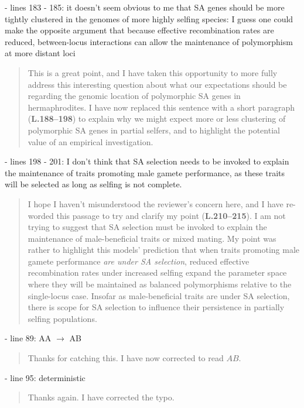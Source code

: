 \documentclass[11pt]{article}
\begin{document}
 - lines 183 - 185: it doesn't seem obvious to me that SA genes should be more tightly clustered in the genomes of more highly selfing species: I guess one could make the opposite argument that because effective recombination rates are reduced, between-locus interactions can allow the maintenance of polymorphism at more distant loci

	\begin{quote}
		This is a great point, and I have taken this opportunity to more fully address this interesting question about what our expectations should be regarding the genomic location of polymorphic SA genes in hermaphrodites. I have now replaced this sentence with a short paragraph (\textbf{L.188--198}) to explain why we might expect more or less clustering of polymorphic SA genes in partial selfers, and to highlight the potential value of an empirical investigation. 
	\end{quote}

 - lines 198 - 201: I don't think that SA selection needs to be invoked to explain the maintenance of traits promoting male gamete performance, as these traits will be selected as long as selfing is not complete.

	\begin{quote}
		I hope I haven't misunderstood the reviewer's concern here, and I have re-worded this passage to try and clarify my point (\textbf{L.210--215}). I am not trying to suggest that SA selection must be invoked to explain the maintenance of male-beneficial traits or mixed mating. My point was rather to highlight this models' prediction that when traits promoting male gamete performance \textit{are under SA selection}, reduced effective recombination rates under increased selfing expand the parameter space where they will be maintained as balanced polymorphisms relative to the single-locus case. Insofar as male-beneficial traits are under SA selection, there is scope for SA selection to influence their persistence in partially selfing populations.
	\end{quote}

 - line 89: AA $\rightarrow$ AB

	\begin{quote}
		Thanks for catching this. I have now corrected to read $AB$.
	\end{quote}

 - line 95: deterministic

	\begin{quote}
		Thanks again. I have corrected the typo.
	\end{quote}
\end{document}
